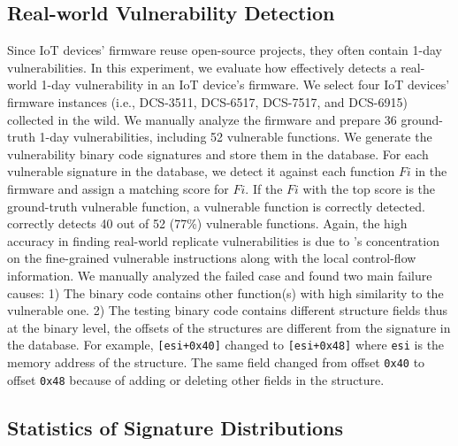 \subsection{Real-world Vulnerability Detection}
Since IoT devices' firmware reuse open-source projects, they often contain 1-day vulnerabilities. 
In this experiment, we evaluate how effectively \name detects a real-world 1-day vulnerability in an IoT device's firmware. 
We select four IoT devices' firmware instances (i.e., DCS-3511, DCS-6517, DCS-7517, and DCS-6915) collected in the wild. 
We manually analyze the firmware and prepare 36 ground-truth 1-day vulnerabilities, including 52 vulnerable functions. 
We generate the vulnerability binary code signatures and store them in the database. 
For each vulnerable signature in the database, we detect it against each function $Fi$ in the firmware and assign a matching score for $Fi$. 
If the $Fi$ with the top score is the ground-truth vulnerable function, a vulnerable function is correctly detected. 
\name correctly detects 40 out of 52 (77\%) vulnerable functions. Again, the high accuracy in finding real-world replicate vulnerabilities is due to \name's concentration on the fine-grained vulnerable instructions along with the local control-flow information. We manually analyzed the failed case and found two main failure causes: 1) The binary code contains other function(s) with high similarity to the vulnerable one. 2) The testing binary code contains different structure fields thus at the binary level, the offsets of the structures are different from the signature in the database. For example, \texttt{[esi+0x40]} changed to \texttt{[esi+0x48]} where \texttt{esi} is the memory address of the structure. The same field changed from offset \texttt{0x40} to offset \texttt{0x48} because of adding or deleting other fields in the structure.


\subsection{Statistics of Signature Distributions}

